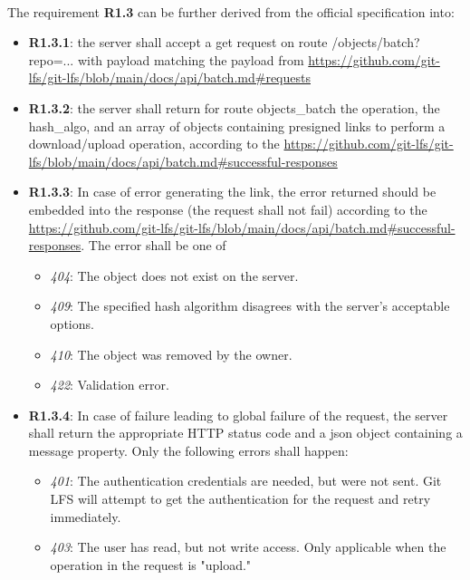 \paragraph{}

The requirement \textbf{R1.3} can be further derived from the official specification into:

\begin{itemize}
    \item \textbf{R1.3.1}: the server shall accept a get request on route /objects/batch?repo=... with payload matching the payload from \url{https://github.com/git-lfs/git-lfs/blob/main/docs/api/batch.md#requests}
    \item \textbf{R1.3.2}: the server shall return for route objects\_batch the operation, the hash\_algo, and an array of objects containing presigned links to perform a download/upload operation, according to the \url{https://github.com/git-lfs/git-lfs/blob/main/docs/api/batch.md#successful-responses}
    \item \textbf{R1.3.3}: In case of error generating the link, the error returned should be embedded into the response (the request shall not fail) according to the \url{https://github.com/git-lfs/git-lfs/blob/main/docs/api/batch.md#successful-responses}. The error shall be one of
          \begin{itemize}
              \item \textit{404}: The object does not exist on the server.
              \item \textit{409}: The specified hash algorithm disagrees with the server's acceptable options.
              \item \textit{410}: The object was removed by the owner.
              \item \textit{422}: Validation error.
          \end{itemize}
    \item \textbf{R1.3.4}: In case of failure leading to global failure of the request, the server shall return the appropriate HTTP status code and a json object containing a message property. Only the following errors shall happen:
          \begin{itemize}
              \item \textit{401}: The authentication credentials are needed, but were not sent. Git LFS will attempt to get the authentication for the request and retry immediately.
              \item \textit{403}: The user has read, but not write access. Only applicable when the operation in the request is "upload."

\end{itemize}
\end{itemize}
